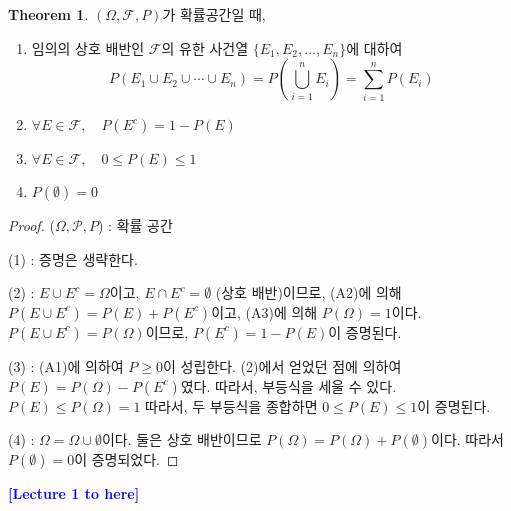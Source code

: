 \documentclass{article}
\theoremstyle{definition}
\newtheorem{theorem}{Theorem}
\begin{document}
\begin{theorem}
    $(\Omega, \mathcal{F}, P)$가 확률공간일 때,

\begin{enumerate}
  \item 임의의 상호 배반인 $\mathcal{F}$의 유한 사건열 $\{E_1, E_2, \dots, E_n\}$에 대하여
  \[
  P(E_1 \cup E_2 \cup \cdots \cup E_n) = P\left( \bigcup_{i=1}^n E_i \right) = \sum_{i=1}^n P(E_i)
  \]

  \item $\forall E \in \mathcal{F}, \quad P(E^c) = 1 - P(E)$

  \item $\forall E \in \mathcal{F}, \quad 0 \leq P(E) \leq 1$

  \item $P(\emptyset) = 0$
\end{enumerate}
\end{theorem}

\begin{proof}
    ($\Omega, \mathcal{P}, P$) : 확률 공간

    \noindent
    (1) : 증명은 생략한다.

    \noindent
    (2) : $E \cup E^c = \Omega$이고, $E \cap E^c = \emptyset$ (상호 배반)이므로, (A2)에 의해 $P(E\cup E^c) = P(E) + P(E^c)$이고, (A3)에 의해 $P(\Omega) = 1$이다. $P(E \cup E^c) = P(\Omega)$이므로, $P(E^c) = 1-P(E)$이 증명된다.

    \noindent
    (3) : (A1)에 의하여 $P \geq 0$이 성립한다. (2)에서 얻었던 점에 의하여 $P(E) = P(\Omega) - P(E^c)$였다. 따라서, 부등식을 세울 수 있다. $P(E) \leq P(\Omega) = 1$ 따라서, 두 부등식을 종합하면 $0 \leq P(E) \leq 1$이 증명된다.

    \noindent
    (4) : $\Omega = \Omega \cup \emptyset$이다. 둘은 상호 배반이므로 $P(\Omega) = P(\Omega) + P(\emptyset)$이다. 따라서 $P(\emptyset) = 0$이 증명되었다. 
\end{proof}

\noindent
\textcolor{blue}{\textbf{[Lecture 1 to here]}}
\end{document}
